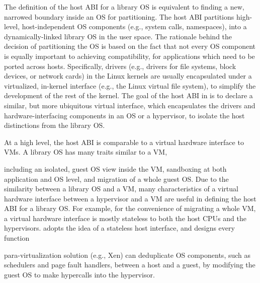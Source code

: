 The definition of the host ABI for a library OS
is equivalent to finding a new, narrowed boundary inside an OS for partitioning.
The host ABI partitions
high-level, host-independent OS components (e.g., system calls, namespaces), into 
a dynamically-linked library OS in the user space.
The rationale behind the decision of partitioning the OS is based on the fact that not every OS component is equally important to achieving compatibility, for applications which need to be ported across hosts.
Specifically, drivers (e.g., drivers for file systems, block devices, or network cards)
in the Linux kernels are usually encapsulated under a virtualized, in-kernel interface (e.g., the Linux virtual file system),
to simplify the development of the rest of the kernel.
The goal of the host ABI in \graphene{} is to declare a similar, but more ubiquitous virtual interface,
which encapsulates the drivers and hardware-interfacing components
in an OS or a hypervisor,
to isolate the host distinctions from the library OS.







At a high level,  the host ABI is comparable to a virtual hardware interface to VMs.
A library OS has many traits similar to a VM,

including an isolated, guest OS view inside the VM, sandboxing at both application and OS level, and migration of a whole guest OS.
Due to the similarity between a library OS and a VM,
many characteristics of a virtual hardware interface between a hypervisor and a VM
are useful in defining the host ABI
for a library OS.
For example, for the convenience of migrating a whole VM,
a virtual hardware interface is mostly stateless to both the host CPUs and the hypervisors.
\graphene{} adopts the idea of a stateless host interface,
and designs every function 



para-virtualization solution (e.g., Xen) can deduplicate OS components, such as  schedulers and page fault handlers, between a host and a guest,
by modifying the guest OS to make hypercalls into the hypervisor.





